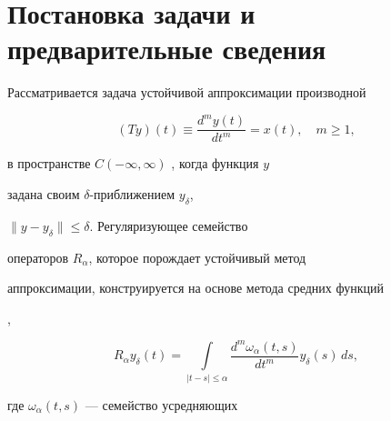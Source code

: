 \date{}




\pagestyle{plain} %







\maketitle


\label{begin}














\section{Постановка задачи и предварительные сведения}





Рассматривается задача устойчивой аппроксимации производной


\begin{equation}\label{1.1}


(T y)(t)\equiv\frac{d^m y(t)}{d t^m}=x(t),\quad m\geq 1,


\end{equation}


в пространстве $ C(-\infty,\infty) $ , когда функция $y$


задана своим $\delta$-приближением $y_{\delta}$,


$\|y-y_{\delta}\|\leq \delta$. Регуляризующее семейство


операторов ${R_{\alpha}}$, которое порождает устойчивый метод


аппроксимации, конструируется на основе метода средних функций


\cite{first}, \cite{second}


\begin{equation}\label{1.2}


R_{\alpha}y_{\delta}(t)=\int\limits_{|t-s|\leq \alpha}\frac{d^m \omega_{\alpha}(t,s)}{d t^m}y_{\delta}(s)\,d s,


\end{equation}


где ${\omega_{\alpha}}(t,s)$ --- семейство усредняющих


